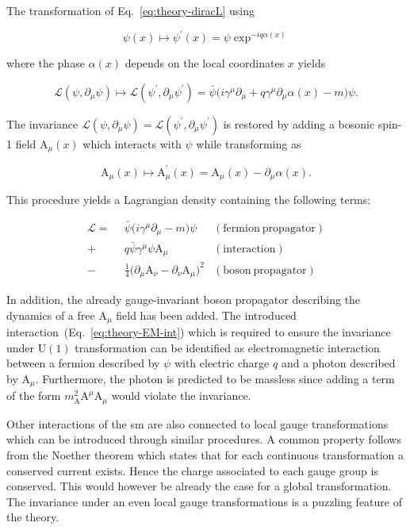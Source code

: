 The transformation of Eq.~\ref{eq:theory-diracL} using 

\begin{equation}
\psi(x)\mapsto\psi^{\prime}(x)=\psi\exp^{-iq\alpha(x)}
\end{equation}

where the phase $\alpha(x)$ depends on the local coordinates $x$ yields

\begin{equation}
\mathcal{L}(\psi,\partial_\mu\psi)\mapsto\mathcal{L}(\psi^{\prime},\partial_\mu\psi^{\prime})=\bar{\psi}\big(i\gamma^\mu\partial_\mu+q\gamma^\mu\partial_\mu\alpha(x)-m\big)\psi.
\end{equation}

The invariance $\mathcal{L}(\psi,\partial_\mu\psi)=\mathcal{L}(\psi^{\prime},\partial_\mu\psi^{\prime})$ is restored by adding a bosonic spin-1 field $\mathrm{A}_{\mu}(x)$ which interacts with $\psi$ while transforming as

\begin{equation}
\mathrm{A}_{\mu}(x)\mapsto \mathrm{A}^{\prime}_{\mu}(x)=\mathrm{A}_\mu(x)-\partial_\mu\alpha(x).
\end{equation}

This procedure yields a Lagrangian density containing the following terms:

\begin{align}
\mathcal{L}=~~&\bar{\psi}\big(i\gamma^\mu\partial_\mu-m\big)\psi &(\mathrm{fermion~propagator}) \\
            +&q\bar{\psi}\gamma^{\mu}\psi \mathrm{A}_{\mu} &(\mathrm{interaction}) \label{eq:theory-EM-int}\\
            -&\tfrac{1}{4}\big(\partial_\mu \mathrm{A}_\nu-\partial_\nu \mathrm{A}_\mu\big)^{2} &(\mathrm{boson~propagator})
\end{align}

In addition, the already gauge-invariant boson propagator describing the dynamics of a free $\mathrm{A}_\mu$ field has been added. The introduced interaction~(Eq.~\ref{eq:theory-EM-int}) which is required to ensure the invariance under $\mathrm{U(1)}$ transformation can be identified as electromagnetic interaction between a fermion described by $\psi$ with electric charge $q$ and a photon described by $\mathrm{A}_\mu$. Furthermore, the photon is predicted to be massless since adding a term of the form $m^{2}_\mathrm{A}\mathrm{A}^\mu \mathrm{A}_\mu$ would violate the invariance.

Other interactions of the \gls{sm} are also connected to local gauge transformations which can be introduced through similar procedures. A common property follows from the Noether theorem which states that for each continuous transformation a conserved current exists. Hence the charge associated to each gauge group is conserved. This would however be already the case for a global transformation. The invariance under an even local gauge transformations is a puzzling feature of the theory.



